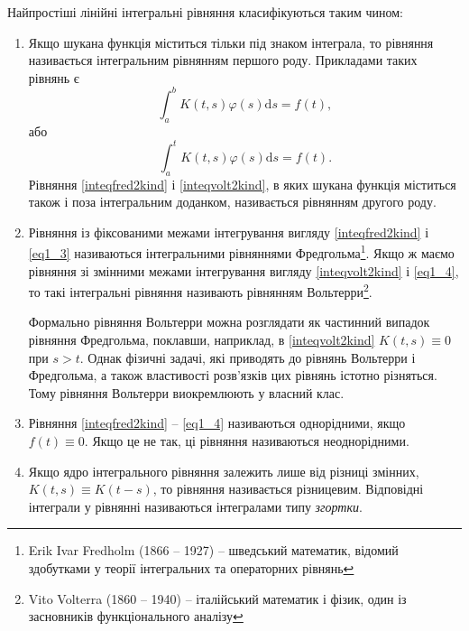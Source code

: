 \documentclass[14pt,twoside]{extreport}
\theoremstyle{mystyle}
\numberwithin{equation}{chapter}
\begin{document}
Найпростіші лінійні інтегральні рівняння класифікуються таким чином:
\begin{enumerate}
	\item Якщо шукана функція міститься тільки під знаком інтеграла, то рівняння називається інтегральним рівнянням першого роду. Прикладами таких рівнянь є
	\begin{equation} \label{eq1_3}
	\int _{a}^{b} K(t, s)\varphi (s)\mathrm{d}s=f(t),
	\end{equation}
	або
	\begin{equation} \label{eq1_4}
	\int _{a}^{t} K(t, s)\varphi (s)\mathrm{d}s=f(t).
	\end{equation}
	Рівняння \eqref{inteqfred2kind} і \eqref{inteqvolt2kind}, в яких шукана функція міститься також і поза інтегральним доданком, називається рівнянням другого роду.
	
	\item Рівняння із фіксованими межами інтегрування вигляду \eqref{inteqfred2kind} і \eqref{eq1_3} називаються інтегральними рівняннями Фредгольма\footnote{Erik Ivar Fredholm (1866 -- 1927) -- шведський математик, відомий здобутками у теорії інтегральних та операторних рівнянь}. Якщо ж маємо рівняння зі змінними межами інтегрування вигляду \eqref{inteqvolt2kind} і \eqref{eq1_4}, то такі інтегральні рівняння називають рівнянням Вольтерри\footnote{Vito Volterra (1860 -- 1940) -- італійський математик і фізик, один із засновників функціонального аналізу}.
	
	Формально рівняння Вольтерри можна розглядати як частинний випадок рівняння Фредгольма, поклавши, наприклад, в \eqref{inteqvolt2kind} $K(t, s) \equiv 0$ при $s>t$. Однак фізичні задачі, які приводять до рівнянь Вольтерри і Фредгольма, а також властивості розв'язків цих рівнянь істотно різняться. Тому рівняння Вольтерри виокремлюють у власний клас.
	
	\item Рівняння \eqref{inteqfred2kind} -- \eqref{eq1_4} називаються однорідними, якщо $f(t)\equiv 0$. Якщо це не так, ці рівняння називаються неоднорідними.
	
	\item Якщо ядро інтегрального рівняння залежить лише від різниці змінних, $K(t, s) \equiv K(t - s)$, то рівняння називається різницевим. Відповідні інтеграли у рівнянні називаються інтегралами типу \emph{згортки}.
\end{enumerate}
\end{document}
